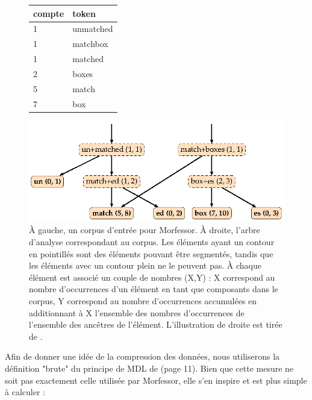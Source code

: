 \documentclass[12pt,a4paper,times,twoside,openright]{report}
\begin{document}
\begin{figure}[ht!]
\begin{minipage}{0.33\linewidth}
    \centering
    \begin{tabular}{|l|l|}
    \hline
    compte & token \\
    \hline
    1      & unmatched \\
    1      & matchbox \\
    1      & matched \\
    2      & boxes \\
    5      & match \\
    7      & box \\
    \hline
    \end{tabular}
\end{minipage}
\begin{minipage}{0.66\linewidth}
    \centering
    \includegraphics[scale=1.0]{images/morfessor/morfessor-tree}
\end{minipage}
\caption{À gauche, un corpus d'entrée pour Morfessor. À droite, l'arbre d'analyse correspondant au corpus. Les éléments ayant un contour en pointillés sont des éléments pouvant être segmentés, tandis que les éléments avec un contour plein ne le peuvent pas. À chaque élément est associé un couple de nombres (X,Y) : X correspond au nombre d'occurrences d'un élément en tant que composants dans le corpus, Y correspond au nombre d'occurrences accumulées en additionnant à X l'ensemble des nombres d'occurrences de l'ensemble des ancêtres de l'élément. L'illustration de droite est tirée de \citet{virpioja2013morfessor}.}
\label{fig:morfessor-tree}
\end{figure}

Afin de donner une idée de la compression des données, nous utiliserons la définition "brute" du principe de MDL de \citet{grunwald2005tutorial} (page 11). Bien que cette mesure ne soit pas exactement celle utilisée par Morfessor, elle s'en inspire et est plus simple à calculer :
\end{document}
